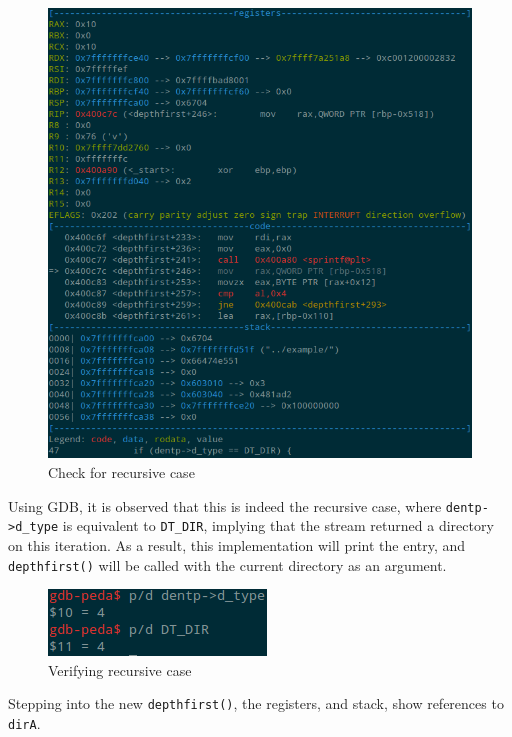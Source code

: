 \documentclass[a4paper,12pt,sffamily]{article}
\begin{document}
\begin{figure}[H]
	\centering
	\includegraphics[width=1\linewidth]{./images/7}
	\caption[directory_check]{Check for recursive case}
	\label{fig:7}
\end{figure}
Using GDB, it is observed that this is indeed the recursive case, where \texttt{dentp->d_type} is
equivalent to \texttt{DT_DIR}, implying that the stream returned a directory on this iteration. As a result, this implementation will print the entry, and \texttt{depthfirst()} will be called
with the current directory as an argument.
\begin{figure}[H]
	\centering
	\includegraphics[width=.3\linewidth]{./images/8}
	\caption[verify_recursive_case]{Verifying recursive case}
	\label{fig:8}
\end{figure}
Stepping into the new \texttt{depthfirst()}, the registers, and stack, show references to 
\texttt{dirA}.
\end{document}
